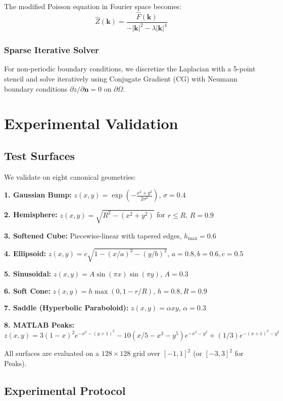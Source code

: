 \documentclass[11pt]{article}
\begin{document}
The modified Poisson equation in Fourier space becomes:
\begin{equation}
\hat{Z}(\mathbf{k}) = \frac{\hat{F}(\mathbf{k})}{-|\mathbf{k}|^2 - \lambda |\mathbf{k}|^4}
\end{equation}

\subsubsection{Sparse Iterative Solver}

For non-periodic boundary conditions, we discretize the Laplacian with a 5-point stencil and solve iteratively using Conjugate Gradient (CG) with Neumann boundary conditions $\partial z/\partial \mathbf{n} = 0$ on $\partial \Omega$.

\section{Experimental Validation}\label{sec:experiments}

\subsection{Test Surfaces}

We validate on eight canonical geometries:

\textbf{1. Gaussian Bump:} $z(x,y) = \exp\left(-\frac{x^2+y^2}{2\sigma^2}\right)$, $\sigma = 0.4$

\textbf{2. Hemisphere:} $z(x,y) = \sqrt{R^2 - (x^2+y^2)}$ for $r \le R$, $R = 0.9$

\textbf{3. Softened Cube:} Piecewise-linear with tapered edges, $h_{\max} = 0.6$

\textbf{4. Ellipsoid:} $z(x,y) = c\sqrt{1 - (x/a)^2 - (y/b)^2}$, $a=0.8, b=0.6, c=0.5$

\textbf{5. Sinusoidal:} $z(x,y) = A\sin(\pi x)\sin(\pi y)$, $A = 0.3$

\textbf{6. Soft Cone:} $z(x,y) = h\max(0, 1-r/R)$, $h=0.8, R=0.9$

\textbf{7. Saddle (Hyperbolic Paraboloid):} $z(x,y) = \alpha xy$, $\alpha = 0.3$

\textbf{8. MATLAB Peaks:} $z(x,y) = 3(1-x)^2 e^{-x^2-(y+1)^2} - 10(x/5-x^3-y^5)e^{-x^2-y^2} + (1/3)e^{-(x+1)^2-y^2}$

All surfaces are evaluated on a $128 \times 128$ grid over $[-1,1]^2$ (or $[-3,3]^2$ for Peaks).

\subsection{Experimental Protocol}
\end{document}
